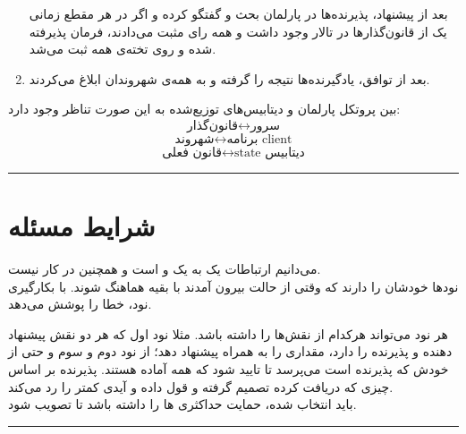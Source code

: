 \documentclass{article}
\begin{document}
\begin{multicols}{2}
\begin{enumerate}
    بعد از پیشنهاد، پذیرنده‌ها در پارلمان بحث و گفتگو کرده و اگر در هر مقطع زمانی یک
    از قانون‌گذارها در تالار وجود داشت و همه رای مثبت می‌دادند، فرمان پذیرفته شده و روی تخته‌ی همه ثبت می‌شد.
    \item بعد از توافق، یادگیرنده‌ها نتیجه را گرفته و به همه‌ی شهروندان ابلاغ می‌کردند.
\end{enumerate}
بین پروتکل پارلمان
و دیتابیس‌های توزیع‌شده به این صورت تناظر وجود دارد:
$$\text{قانون‌گذار} \leftrightarrow \text{سرور}$$
$$\text{شهروند} \leftrightarrow \text{برنامه client}$$
$$\text{قانون فعلی} \leftrightarrow \text{state دیتابیس}$$
\rule{\linewidth}{1pt}

\section*{شرایط مسئله}
می‌دانیم ارتباطات یک به یک و
است و همچنین
در کار نیست.\\
نودها
خودشان را دارند که وقتی از حالت
بیرون آمدند با بقیه هماهنگ شوند.
با بکارگیری
نود،
خطا را پوشش می‌دهد.

هر نود می‌تواند
هرکدام از نقش‌ها را داشته
باشد. مثلا نود اول که هر دو نقش پیشنهاد دهنده و پذیرنده را دارد، مقداری را به همراه
پیشنهاد دهد؛ از نود دوم و سوم و حتی از خودش که پذیرنده است می‌پرسد تا تایید شود که همه آماده هستند. پذیرنده بر اساس چیزی که دریافت کرده تصمیم گرفته و قول
داده و آیدی کمتر را رد می‌کند.\\
باید
انتخاب شده، حمایت حداکثری
ها را داشته باشد تا تصویب شود.\\
\rule{\linewidth}{1pt}


\end{multicols}
\end{document}
